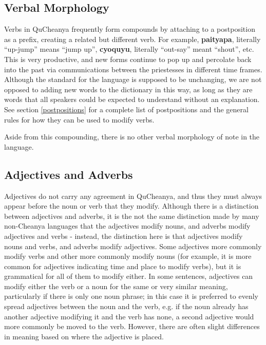 \documentclass{article}
\begin{document}
\subsection{Verbal Morphology}

Verbs in QuCheanya frequently form compounds by attaching to a postposition as a prefix, creating a related but different verb.  For example, \textbf{paityapa}, literally ``up-jump'' means ``jump up'', \textbf{cyoquyu}, literally ``out-say'' meant ``shout'', etc.  This is very productive, and new forms continue to pop up and percolate back into the past via communications between the priestesses in different time frames.  Although the standard for the language is supposed to be unchanging, we are not opposed to adding new words to the dictionary in this way, as long as they are words that all speakers could be expected to understand without an explanation. See section \ref{postpositions} for a complete list of postpositions and the general rules for how they can be used to modify verbs.

Aside from this compounding, there is no other verbal morphology of note in the language.

\subsection{Adjectives and Adverbs}

Adjectives do not carry any agreement in QuCheanya, and thus they must always appear before the noun or verb that they modify. Although there is a distinction between adjectives and adverbs, it is the not the same distinction made by many non-Cheanya languages that the adjectives modify nouns, and adverbs modify adjectives and verbs - instead, the distinction here is that adjectives modify nouns and verbs, and adverbs modify adjectives. Some adjectives more commonly modify verbs and other more commonly modify nouns (for example, it is more common for adjectives indicating time and place to modify verbs), but it is grammatical for all of them to modify either.  In some sentences, adjectives can modify either the verb or a noun for the same or very similar meaning, particularly if there is only one noun phrase; in this case it is preferred to evenly spread adjectives between the noun and the verb, e.g. if the noun already has another adjective modifying it and the verb has none, a second adjective would more commonly be moved to the verb. However, there are often slight differences in meaning based on where the adjective is placed.
\end{document}
